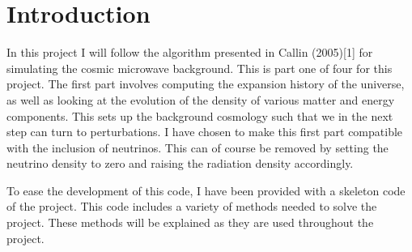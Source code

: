 \documentclass{aa}   %
\begin{document}
  



\section{Introduction}\label{sec:introduction}
In this project I will follow the algorithm presented in Callin (2005)[1] for simulating the cosmic microwave background.  
This is part one of four for this project.
The first part involves computing the expansion history of the universe, as well as looking at the evolution of the density of various matter and energy components. This sets up the background cosmology such that we in the next step can turn to perturbations.
I have chosen to make this first part compatible with the inclusion of neutrinos.
This can of course be removed by setting the neutrino density to zero and raising the radiation density accordingly.

To ease the development of this code, I have been provided with a skeleton code of the project. 
This code includes a variety of methods needed to solve the project. These methods will be explained as they are used throughout the  project.

\end{document}

